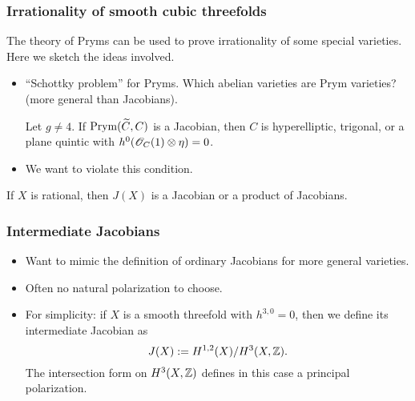 \begin{frame}
\frametitle{Irrationality of smooth cubic threefolds}

The theory of Pryms can be used to prove irrationality of some special varieties. Here we sketch the ideas involved.
\pause

\begin{itemize}
	\item ``Schottky problem'' for Pryms. Which abelian varieties are Prym varieties? (more general than Jacobians).
	\begin{theorem}[Shokurov]
	Let $g \neq 4$. If $\operatorname{Prym}(\widetilde C, C)$ is a Jacobian, then $C$ is hyperelliptic, trigonal, or a plane quintic with $h^0(\mathscr{O}_C(1) \otimes \eta)=0$. 
	\end{theorem}
	\pause
	\item We want to violate this condition.
\end{itemize}

\begin{theorem}
If $X$ is rational, then $J(X)$ is a Jacobian or a product of Jacobians.
\end{theorem}

\end{frame}

\begin{frame}
\frametitle{Intermediate Jacobians}

\begin{itemize}
	\item Want to mimic the definition of ordinary Jacobians for more general varieties.
	\pause
	\item Often no natural polarization to choose.
	\pause
	\item For simplicity: if $X$ is a smooth threefold with $h^{3,0}=0$, then we define its \alert{intermediate Jacobian} as
	\[
	J(X) := H^{1,2}(X)/H^3(X,\mathbb{Z}).
	\]
	The intersection form on $H^3(X,\mathbb{Z})$ defines in this case a principal polarization.
\end{itemize}

\end{frame}

